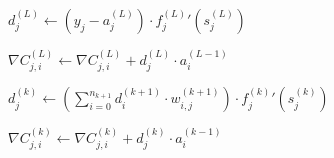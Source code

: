 \documentclass[titlepage]{article}
\begin{document}
      \begin{algorithm}
        \caption{%
          Calculate the gradient with error backpropagation for the given
          expected output ($\mathbf{y} \in \mathbb{R}^{n_L}$), and merge it
          into the gradient of the current batch.
        } \label{algadjustgradient}
        \begin{algorithmic}
              \State $
                d_j^{(L)} \gets
                  \left( y_j - a_j^{(L)} \right)
                  \cdot
                  {f_j^{(L)}}' \left( s_j^{(L)} \right)
              $

                \State $
                  \nabla C_{j,i}^{(L)} \gets
                    \nabla C_{j,i}^{(L)} + d_j^{(L)} \cdot a_i^{(L-1)}
                $
              \EndFor
            \EndFor

                \State $
                  d_j^{(k)} \gets
                    \left(
                      \sum_{i=0}^{n_{k+1}} d_i^{(k+1)} \cdot w_{i,j}^{(k+1)}
                    \right)
                    \cdot
                    {f_j^{(k)}}' \left( s_j^{(k)} \right)
                $

                  \State $
                    \nabla C_{j,i}^{(k)} \gets
                      \nabla C_{j,i}^{(k)} + d_j^{(k)} \cdot a_i^{(k-1)}
                  $
                \EndFor
              \EndFor
            \EndFor
          \EndProcedure
        \end{algorithmic}
      \end{algorithm}
\end{document}
